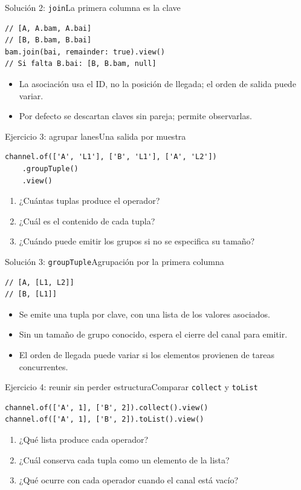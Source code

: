 \documentclass[handout,aspectratio=169,10pt]{beamer}
\newcommand{\code}[1]{\texttt{\detokenize{#1}}}
\begin{document}
\begin{frame}[fragile]{Solución 2: \texttt{join}}{La primera columna es la clave}
\begin{lstlisting}
// [A, A.bam, A.bai]
// [B, B.bam, B.bai]
bam.join(bai, remainder: true).view()
// Si falta B.bai: [B, B.bam, null]
\end{lstlisting}
\begin{itemize}\item La asociación usa el ID, no la posición de llegada; el orden de salida puede variar.\item Por defecto se descartan claves sin pareja; \code{remainder: true} permite observarlas.\end{itemize}
\end{frame}
\begin{frame}[fragile]{Ejercicio 3: agrupar lanes}{Una salida por muestra}
\begin{lstlisting}
channel.of(['A', 'L1'], ['B', 'L1'], ['A', 'L2'])
    .groupTuple()
    .view()
\end{lstlisting}
\begin{enumerate}\setlength\itemsep{8pt}
\item ¿Cuántas tuplas produce el operador?
\item ¿Cuál es el contenido de cada tupla?
\item ¿Cuándo puede emitir los grupos si no se especifica su tamaño?
\end{enumerate}
\end{frame}
\begin{frame}[fragile]{Solución 3: \texttt{groupTuple}}{Agrupación por la primera columna}
\begin{lstlisting}
// [A, [L1, L2]]
// [B, [L1]]
\end{lstlisting}
\begin{itemize}\setlength\itemsep{7pt}
\item Se emite una tupla por clave, con una lista de los valores asociados.
\item Sin un tamaño de grupo conocido, \code{groupTuple()} espera el cierre del canal para emitir.
\item El orden de llegada puede variar si los elementos provienen de tareas concurrentes.
\end{itemize}
\end{frame}
\begin{frame}[fragile]{Ejercicio 4: reunir sin perder estructura}{Comparar \texttt{collect} y \texttt{toList}}
\begin{lstlisting}
channel.of(['A', 1], ['B', 2]).collect().view()
channel.of(['A', 1], ['B', 2]).toList().view()
\end{lstlisting}
\begin{enumerate}\setlength\itemsep{8pt}
\item ¿Qué lista produce cada operador?
\item ¿Cuál conserva cada tupla como un elemento de la lista?
\item ¿Qué ocurre con cada operador cuando el canal está vacío?
\end{enumerate}
\end{frame}
\end{document}
